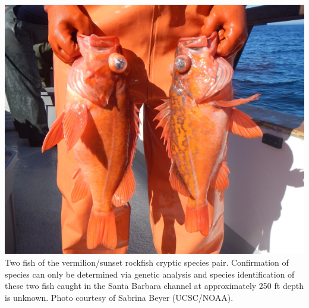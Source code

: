 \documentclass[11pt,
  english,
]{article}
\begin{document}
\newpage
\thispagestyle{empty} %

\pagestyle{plain}  %
\renewcommand*{\thefootnote}{\arabic{footnote}}  %
\setcounter{footnote}{0}  %
\renewcommand{\headrulewidth}{0.5pt}
\renewcommand{\footrulewidth}{0.5pt}

\newcommand{\lt}{\ensuremath <}
\newcommand{\gt}{\ensuremath >}

\newcommand\CapeM{$40^\circ 10^\prime N$}
\newcommand\PtC{$34^\circ 27^\prime N$}
\newcommand\CAOR{$42^\circ 00^\prime N$}

\newpage

\includegraphics{cover_photo.png} Two fish of the vermilion/sunset rockfish cryptic species pair. Confirmation of species can only be determined via genetic analysis and species identification of these two fish caught in the Santa Barbara channel at approximately 250 ft depth is unknown. Photo courtesy of Sabrina Beyer (UCSC/NOAA).

\pagebreak
{}
\setcounter{page}{1}

\renewcommand{\thetable}{\roman{table}}
\renewcommand{\thefigure}{\roman{figure}}

\setlength\parskip{0.5em plus 0.1em minus 0.2em}
\end{document}
